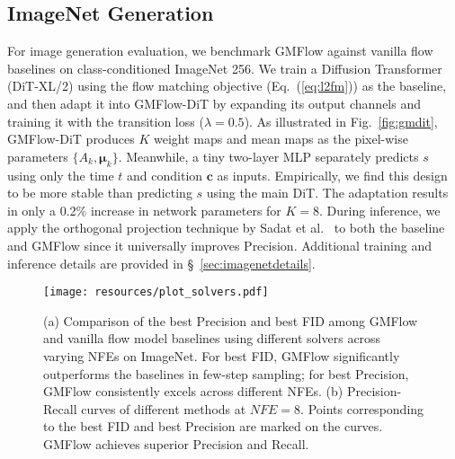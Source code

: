 \documentclass{article}
\def\vmu{{\bm{\mu}}}
\def\vc{{\bm{c}}}
\theoremstyle{custom}
\theoremstyle{definition}
\theoremstyle{remark}
\newcommand{\methodname}{{GMFlow}}
\begin{document}
\subsection{ImageNet Generation}

For image generation evaluation, we benchmark GMFlow against vanilla flow baselines on class-conditioned ImageNet 256. We train a Diffusion Transformer (DiT-XL/2) \cite{dit,attention} using the flow matching objective (Eq.~(\ref{eq:l2fm})) as the baseline, and then adapt it into GMFlow-DiT by expanding its output channels and training it with the transition loss ($\lambda=0.5$). As illustrated in Fig.~\ref{fig:gmdit}, GMFlow-DiT produces $K$ weight maps and mean maps as the pixel-wise parameters $\{A_k, \vmu_k\}$. Meanwhile, a tiny two-layer MLP separately predicts $s$ using only the time $t$ and condition $\vc$ as inputs. Empirically, we find this design to be more stable than predicting $s$ using the main DiT. The adaptation results in only a 0.2\% increase in network parameters for $K = 8$. During inference, we apply the orthogonal projection technique by Sadat et al.~ to both the baseline and GMFlow since it universally improves Precision. 
Additional training and inference details are provided in \S~\ref{sec:imagenetdetails}.

\begin{figure}[t]
\vspace{-6pt}
\begin{center}
\texttt{[image: resources/plot\_solvers.pdf]}
\caption{(a) Comparison of the best Precision and best FID among \methodname{} and vanilla flow model baselines using different solvers across varying NFEs on ImageNet. For best FID, \methodname{} significantly outperforms the baselines in few-step sampling; for best Precision, \methodname{} consistently excels across different NFEs.
(b) Precision-Recall curves of different methods at $\mathit{NFE}= 8$. Points corresponding to the best FID and best Precision are marked on the curves. \methodname{} achieves superior Precision and Recall.
}
\label{fig:comparisonplot}
\end{center}
\end{figure}
\end{document}
